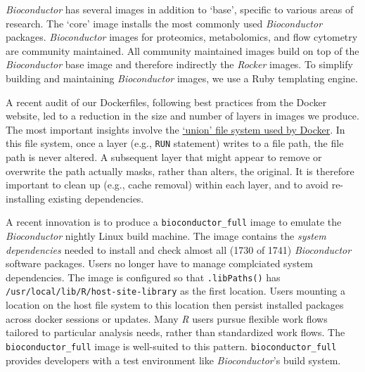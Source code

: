 \emph{Bioconductor} has several images in addition to `base', specific
to various areas of research. The `core' image installs the most
commonly used \emph{Bioconductor} packages. \emph{Bioconductor} images
for proteomics, metabolomics, and flow cytometry are community
maintained. All community maintained images build on top of the
\emph{Bioconductor} base image and therefore indirectly the
\emph{Rocker} images. To simplify building and maintaining
\emph{Bioconductor} images, we use a Ruby templating engine.

A recent audit of our Dockerfiles, following best practices from the
Docker website, led to a reduction in the size and number of layers in
images we produce. The most important insights involve the
\href{https://docs.docker.com/storage/storagedriver/overlayfs-driver/\#how-container-reads-and-writes-work-with-overlay-or-overlay2}{`union'
file system used by Docker}. In this file system, once a layer (e.g.,
\texttt{RUN} statement) writes to a file path, the file path is never
altered. A subsequent layer that might appear to remove or overwrite the
path actually masks, rather than alters, the original. It is therefore
important to clean up (e.g., cache removal) within each layer, and to
avoid re-installing existing dependencies.

A recent innovation is to produce a \texttt{bioconductor\_full} image to
emulate the \emph{Bioconductor} nightly Linux build machine. The image
contains the \emph{system dependencies} needed to install and check
almost all (1730 of 1741) \emph{Bioconductor} software packages. Users
no longer have to manage complciated system dependencies. The image is
configured so that \texttt{.libPaths()} has
\texttt{/usr/local/lib/R/host-site-library} as the first location. Users
mounting a location on the host file system to this location then
persist installed packages across docker sessions or updates. Many
\emph{R} users pursue flexible work flows tailored to particular
analysis needs, rather than standardized work flows. The
\texttt{bioconductor\_full} image is well-suited to this pattern.
\texttt{bioconductor\_full} provides developers with a test environment
like \emph{Bioconductor}'s build system.

